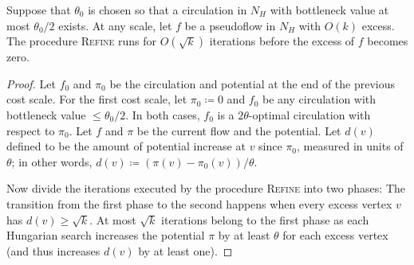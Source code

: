 \documentclass[a4paper,UKenglish]{socg-lipics-v2018}
\makeatletter
\def\etal{\emph{et~al.}}
\def\etal{\textit{et~al.}}
\theoremstyle{plain}
\numberwithin{figure}{section}
\def\EMPH#1{\textcolor{BrickRed}{{\emph{#1}}}}
\def\n@te#1{\textsf{\boldmath \textbf{$\langle\!\langle$#1$\rangle\!\rangle$}}\leavevmode}
\def\note#1{\textcolor{red}{\n@te{#1}}}
\makeatother
\begin{document}
\begin{lemmarep}
\label{lemma:goldberg_refine_iterations}
Suppose that $\theta_0$ is chosen so that a circulation in $N_H$
with bottleneck value at most $\theta_0/2$ exists.
At any scale, let $f$ be a pseudoflow in $N_H$ with $O(k)$ excess.
The procedure \textsc{Refine} runs for $O(\sqrt{k})$ iterations
before the excess of $f$ becomes zero.
\end{lemmarep}

\begin{proof}
Let $f_0$ and $\pi_0$ be the circulation and
potential at the end of the previous cost scale.
For the first cost scale, let $\pi_0 \coloneqq 0$ and $f_0$ be any circulation with bottleneck value $\leq \theta_0/2$.
In both cases, $f_0$ is a $2\theta$-optimal circulation with respect to $\pi_0$.
Let $f$ and $\pi$ be the current flow and the potential.
Let \EMPH{$d(v)$} defined to be the amount of potential increase at $v$ since $\pi_0$, measured in units of $\theta$; in other words, $d(v) \coloneqq (\pi(v) - \pi_0(v)) / \theta$.
%

Now divide the iterations executed by
the procedure \textsc{Refine}
into two phases:  The transition from the first phase to the second happens when every excess vertex $v$ has $d(v) \ge \sqrt{k}$.
%
At most $\sqrt{k}$ iterations belong to
the first phase as each Hungarian search increases the potential $\pi$ by at least $\theta$ for each excess vertex (and thus increases $d(v)$ by at least one).


\end{proof}
\end{document}
